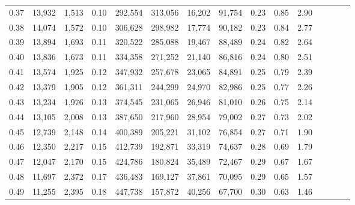 \begin{tabular}{rrrcrrrrrrrrrrr}
0.37 &  13,932 &  1,513 &                                       0.10 &  292,554 &  313,056 &   16,202 &   91,754 &  0.23 &  0.85 &                         2.90 \\
0.38 &  14,074 &  1,572 &                                       0.10 &  306,628 &  298,982 &   17,774 &   90,182 &  0.23 &  0.84 &                         2.77 \\
0.39 &  13,894 &  1,693 &                                       0.11 &  320,522 &  285,088 &   19,467 &   88,489 &  0.24 &  0.82 &                         2.64 \\
0.40 &  13,836 &  1,673 &                                       0.11 &  334,358 &  271,252 &   21,140 &   86,816 &  0.24 &  0.80 &                         2.51 \\
0.41 &  13,574 &  1,925 &                                       0.12 &  347,932 &  257,678 &   23,065 &   84,891 &  0.25 &  0.79 &                         2.39 \\
0.42 &  13,379 &  1,905 &                                       0.12 &  361,311 &  244,299 &   24,970 &   82,986 &  0.25 &  0.77 &                         2.26 \\
0.43 &  13,234 &  1,976 &                                       0.13 &  374,545 &  231,065 &   26,946 &   81,010 &  0.26 &  0.75 &                         2.14 \\
0.44 &  13,105 &  2,008 &                                       0.13 &  387,650 &  217,960 &   28,954 &   79,002 &  0.27 &  0.73 &                         2.02 \\
0.45 &  12,739 &  2,148 &                                       0.14 &  400,389 &  205,221 &   31,102 &   76,854 &  0.27 &  0.71 &                         1.90 \\
0.46 &  12,350 &  2,217 &                                       0.15 &  412,739 &  192,871 &   33,319 &   74,637 &  0.28 &  0.69 &                         1.79 \\
0.47 &  12,047 &  2,170 &                                       0.15 &  424,786 &  180,824 &   35,489 &   72,467 &  0.29 &  0.67 &                         1.67 \\
0.48 &  11,697 &  2,372 &                                       0.17 &  436,483 &  169,127 &   37,861 &   70,095 &  0.29 &  0.65 &                         1.57 \\
0.49 &  11,255 &  2,395 &                                       0.18 &  447,738 &  157,872 &   40,256 &   67,700 &  0.30 &  0.63 &                         1.46 \\

\end{tabular}
